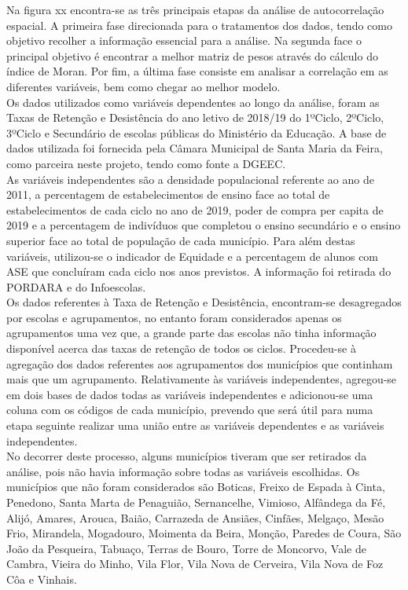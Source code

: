 \documentclass[
]{book}
\theoremstyle{definition}
\theoremstyle{definition}
\theoremstyle{definition}
\theoremstyle{definition}
\theoremstyle{remark}
\begin{document}
Na figura xx encontra-se as três principais etapas da análise de autocorrelação espacial. A primeira fase direcionada para o tratamentos dos dados, tendo como objetivo recolher a informação essencial para a análise. Na segunda face o principal objetivo é encontrar a melhor matriz de pesos através do cálculo do índice de Moran. Por fim, a última fase consiste em analisar a correlação em as diferentes variáveis, bem como chegar ao melhor modelo.\\
Os dados utilizados como variáveis dependentes ao longo da análise, foram as Taxas de Retenção e Desistência do ano letivo de 2018/19 do 1ºCiclo, 2ºCiclo, 3ºCiclo e Secundário de escolas públicas do Ministério da Educação. A base de dados utilizada foi fornecida pela Câmara Municipal de Santa Maria da Feira, como parceira neste projeto, tendo como fonte a DGEEC.\\
As variáveis independentes são a densidade populacional referente ao ano de 2011, a percentagem de estabelecimentos de ensino face ao total de estabelecimentos de cada ciclo no ano de 2019, poder de compra per capita de 2019 e a percentagem de indivíduos que completou o ensino secundário e o ensino superior face ao total de população de cada município. Para além destas variáveis, utilizou-se o indicador de Equidade e a percentagem de alunos com ASE que concluíram cada ciclo nos anos previstos. A informação foi retirada do PORDARA e do Infoescolas.\\
Os dados referentes à Taxa de Retenção e Desistência, encontram-se desagregados por escolas e agrupamentos, no entanto foram considerados apenas os agrupamentos uma vez que, a grande parte das escolas não tinha informação disponível acerca das taxas de retenção de todos os ciclos. Procedeu-se à agregação dos dados referentes aos agrupamentos dos municípios que continham mais que um agrupamento. Relativamente às variáveis independentes, agregou-se em dois bases de dados todas as variáveis independentes e adicionou-se uma coluna com os códigos de cada município, prevendo que será útil para numa etapa seguinte realizar uma união entre as variáveis dependentes e as variáveis independentes.\\
No decorrer deste processo, alguns municípios tiveram que ser retirados da análise, pois não havia informação sobre todas as variáveis escolhidas. Os municípios que não foram considerados são Boticas, Freixo de Espada à Cinta, Penedono, Santa Marta de Penaguião, Sernancelhe, Vimioso, Alfândega da Fé, Alijó, Amares, Arouca, Baião, Carrazeda de Ansiães, Cinfães, Melgaço, Mesão Frio, Mirandela, Mogadouro, Moimenta da Beira, Monção, Paredes de Coura, São João da Pesqueira, Tabuaço, Terras de Bouro, Torre de Moncorvo, Vale de Cambra, Vieira do Minho, Vila Flor, Vila Nova de Cerveira, Vila Nova de Foz Côa e Vinhais.\\
\end{document}
